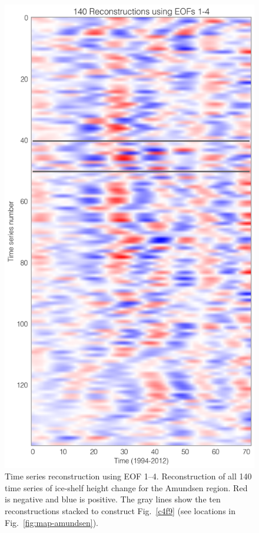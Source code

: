 \begin{figure}[!ht]
  \centering
  \includegraphics[width=.72\textwidth]{img/amu_rc1234_all.png}
  \caption[Time series reconstruction using EOF 1--4]{
  Time series reconstruction using EOF 1--4. Reconstruction of all 140 time series of ice-shelf height change for the Amundsen region. Red is negative and blue is positive. The gray lines show the ten reconstructions stacked to construct Fig.~\ref{c4f9} (see locations in Fig.~\ref{fig:map-amundsen}).
  }
  \label{fig:rc1234-all}
\end{figure}


